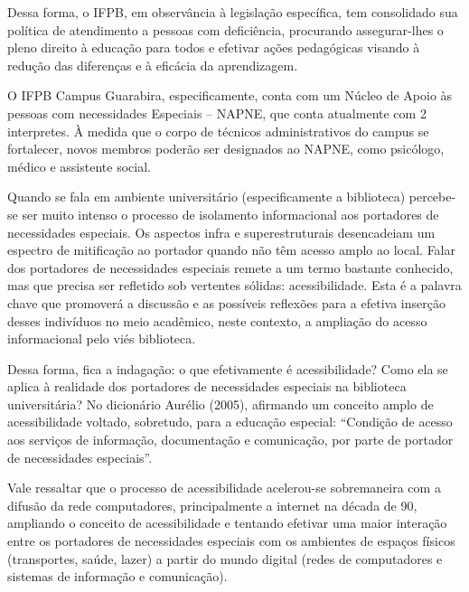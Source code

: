 	Dessa forma, o IFPB, em observância à legislação específica, tem consolidado sua política de atendimento a pessoas com deficiência, procurando assegurar-lhes o pleno direito à educação para todos e efetivar ações pedagógicas visando à redução das diferenças e à eficácia da aprendizagem.
 
	O IFPB Campus Guarabira, especificamente, conta com um Núcleo de Apoio às pessoas com necessidades Especiais – NAPNE, que conta atualmente com 2 interpretes. \`A medida que o corpo de t\'ecnicos administrativos do campus se fortalecer, novos membros poder\~ao ser designados ao NAPNE, como psic\'ologo, m\'edico e assistente social.



	Quando se fala em ambiente universitário (especificamente a biblioteca) percebe-se ser muito intenso o processo de isolamento informacional aos portadores de necessidades especiais. Os aspectos infra e superestruturais desencadeiam um espectro de mitificação ao portador quando não têm acesso amplo ao local.
Falar dos portadores de necessidades especiais remete a um termo bastante conhecido, mas que precisa ser refletido sob vertentes sólidas: acessibilidade. Esta é a palavra chave que promoverá a discussão e as possíveis reflexões para a efetiva inserção desses indivíduos no meio acadêmico, neste contexto, a ampliação do acesso informacional pelo viés biblioteca.

	Dessa forma, fica a indagação: o que efetivamente é acessibilidade? Como ela se aplica à realidade dos portadores de necessidades especiais na biblioteca universitária? No dicionário Aurélio (2005), afirmando um conceito amplo de acessibilidade voltado, sobretudo, para a educação especial: “Condição de acesso aos serviços de informação, documentação e comunicação, por parte de portador de necessidades especiais”.

	Vale ressaltar que o processo de acessibilidade acelerou-se sobremaneira com a difusão da rede computadores, principalmente a internet na década de 90, ampliando o conceito de acessibilidade e tentando efetivar uma maior interação entre os portadores de necessidades especiais com os ambientes de espaços físicos (transportes, saúde, lazer) a partir do mundo digital (redes de computadores e sistemas de informação e comunicação).

